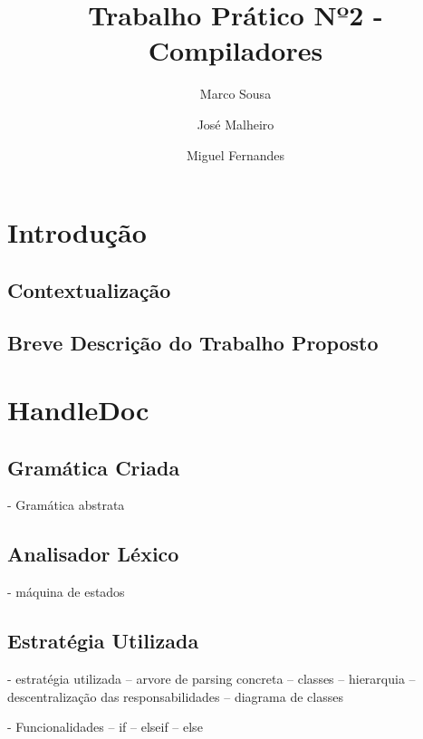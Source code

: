 \documentclass[runningheads]{llncs}
\begin{document}
%
\title{Trabalho Prático Nº2 - Compiladores}
%
%
\author{Marco Sousa \and
José Malheiro \and
Miguel Fernandes}
%
%
\maketitle              %
%
\begin{abstract}

\end{abstract}
%
%
%
\section{Introdução}
\subsection{Contextualização} 



\subsection{Breve Descrição do Trabalho Proposto}



\section{HandleDoc}
\subsection{Gramática Criada} \label{subsec:grammar}
- Gramática abstrata

\subsection{Analisador Léxico} \label{subsec:lex}
- máquina de estados

\subsection{Estratégia Utilizada}
- estratégia utilizada
-- arvore de parsing concreta
-- classes
-- hierarquia
-- descentralização das responsabilidades
-- diagrama de classes

- Funcionalidades
-- if 
-- elseif
-- else 
\end{document}
